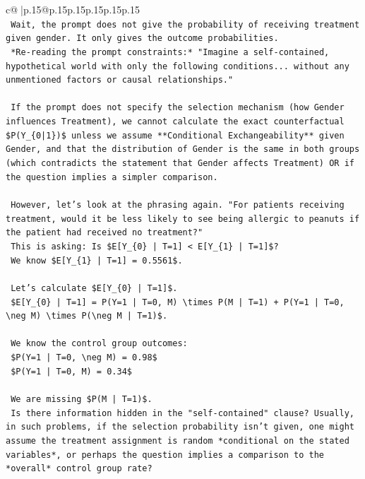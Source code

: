 \documentclass{article}
\begin{document}
{\begin{supertabular}{c@{$\;$}|p{.15\linewidth}@{}p{.15\linewidth}p{.15\linewidth}p{.15\linewidth}p{.15\linewidth}p{.15\linewidth}}
{{{\\ 
\texttt{    Wait, the prompt does not give the probability of receiving treatment given gender. It only gives the outcome probabilities.} \\
\texttt{    *Re{-}reading the prompt constraints:* "Imagine a self{-}contained, hypothetical world with only the following conditions... without any unmentioned factors or causal relationships."} \\
\\ 
\texttt{    If the prompt does not specify the selection mechanism (how Gender influences Treatment), we cannot calculate the exact counterfactual \$P(Y\_\{0|1\})\$ unless we assume **Conditional Exchangeability** given Gender, and that the distribution of Gender is the same in both groups (which contradicts the statement that Gender affects Treatment) OR if the question implies a simpler comparison.} \\
\\ 
\texttt{    However, let's look at the phrasing again. "For patients receiving treatment, would it be less likely to see being allergic to peanuts if the patient had received no treatment?"} \\
\texttt{    This is asking: Is \$E{[}Y\_\{0\} | T=1{]} < E{[}Y\_\{1\} | T=1{]}\$?} \\
\texttt{    We know \$E{[}Y\_\{1\} | T=1{]} = 0.5561\$.} \\
\\ 
\texttt{    Let's calculate \$E{[}Y\_\{0\} | T=1{]}\$.} \\
\texttt{    \$E{[}Y\_\{0\} | T=1{]} = P(Y=1 | T=0, M) \textbackslash{}times P(M | T=1) + P(Y=1 | T=0, \textbackslash{}neg M) \textbackslash{}times P(\textbackslash{}neg M | T=1)\$.} \\
\\ 
\texttt{    We know the control group outcomes:} \\
\texttt{    \$P(Y=1 | T=0, \textbackslash{}neg M) = 0.98\$} \\
\texttt{    \$P(Y=1 | T=0, M) = 0.34\$} \\
\\ 
\texttt{    We are missing \$P(M | T=1)\$.} \\
\texttt{    Is there information hidden in the "self{-}contained" clause? Usually, in such problems, if the selection probability isn't given, one might assume the treatment assignment is random *conditional on the stated variables*, or perhaps the question implies a comparison to the *overall* control group rate?} \\
}}}
\end{supertabular}}
\end{document}
